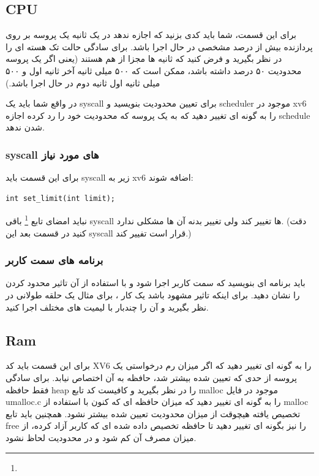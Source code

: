 \documentclass{article}
\begin{document}
		\subsection{CPU}
		برای این قسمت، شما باید کدی بزنید که اجازه ندهد در یک ثانیه یک پروسه  بر روی پردازنده بیش از درصد مشخصی در حال اجرا باشد.  برای سادگی حالت تک هسته ای را در نظر بگیرید و فرض کنید که ثانیه ها مجزا از هم هستند (یعنی اگر یک پروسه محدودیت ۵۰ درصد داشته باشد، ممکن است که ۵۰۰ میلی ثانیه آخر ثانیه اول و ۵۰۰ میلی ثانیه اول ثانیه دوم در حال اجرا باشد.)
		
		در واقع شما باید یک syscall برای تعیین محدودیت بنویسید و scheduler موجود در xv6 را به گونه ای تغییر دهید که  به یک پروسه که محدودیت خود را رد کرده  اجازه schedule شدن ندهد.
		
		\subsubsection{
			syscall
			های مورد نیاز
		}
		برای این قسمت باید syscall زیر به xv6 اضافه شوند:
		\begin{verbatim}
int set_limit(int limit);
		\end{verbatim}
		نباید امضای تابع
		\footnote{}
		باقی syscall ها تغییر کند ولی تغییر بدنه آن ها مشکلی ندارد. 
		(دقت کنید در قسمت بعد این syscall قرار است تفییر کند.)
		
		\subsubsection{
			برنامه های سمت کاربر
		}
		باید برنامه ای بنویسید که سمت کاربر اجرا شود و با استفاده از آن تاثیر محدود کردن  را نشان دهید. برای اینکه تاثیر مشهود باشد یک کار ، برای مثال یک حلقه  طولانی در نظر بگیرید و آن را چندبار با لیمیت های مختلف اجرا کنید.
		
		\subsection{Ram}
		برای این قسمت باید کد XV6 را به گونه ای تغییر دهید که اگر میزان رم درخواستی یک پروسه از حدی که تعیین شده بیشتر شد، حافظه به آن اختصاص نیابد. برای سادگی فقط حافظه heap را در نظر بگیرید و کافیست کد تابع malloc موجود در فایل umalloc.c را به گونه ای تغییر دهید که میزان حافظه ای که  کنون با استفاده از malloc تخصیص یافته هیچوقت از میزان محدودیت تعیین شده بیشتر نشود. همچنین باید تابع free را نیز بگونه ای تغییر دهید تا حافظه تخصیص داده شده ای که کاربر آزاد کرده، از میزان مصرف آن کم شود و در محدودیت لحاظ نشود. 
		
\end{document}
